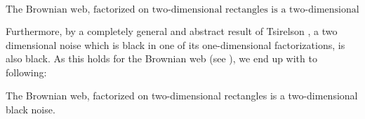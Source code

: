 {\[\text{The Brownian web, factorized on two-dimensional
rectangles is a two-dimensional noise.}\]

Furthermore, by a completely general and abstract result
of Tsirelson , a two dimensional noise which is
black in one of its one-dimensional factorizations, is also
black. As this holds for the Brownian web (see ),
we end up with to following:

\begin{theorem}
The Brownian web, factorized on two-dimensional rectangles is a two-dimensional black noise.
\end{theorem}



}
